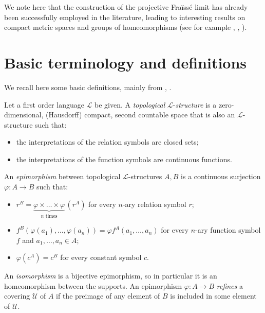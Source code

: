 \documentclass[12pt,twoside,a4paper]{amsart}
\theoremstyle{plain}
\theoremstyle{definition}
\begin{document}
We note here that the construction of the projective Fra\"iss\'e limit has already been successfully employed in the literature, leading to interesting results on compact metric spaces and groups of homeomorphisms (see for example \cite{Kwiatk2012}, \cite{Kwiatk2014}, \cite{Bartos2015}).

\section{Basic terminology and definitions} \label{defandnot}
We recall here some basic definitions, mainly from \cite{Irwin2006}, \cite{Camerl2010}.

Let a first order language $ \mathcal L $ be given.
A {\it topological} $ \mathcal L $-{\it structure} is a zero-dimensional, (Hausdorff) compact, second countable space that is also an $ \mathcal L $-structure such that:
\begin{itemize}
\item the interpretations of the relation symbols are closed sets;
\item the interpretations of the function symbols are continuous functions.
\end{itemize}
An {\it epimorphism} between topological $ \mathcal L $-structures $A,B$ is a continuous surjection $ {\varphi} :A\to B$ such that:
\begin{itemize}
\item $r^B=\underset{n \text{ times}}{\underbrace{ {\varphi} \times \ldots \times {\varphi}}}\,(r^A)$ for every $n$-ary relation symbol $r$;
\item $f^B( {\varphi} (a_1),\ldots , {\varphi} (a_n))= {\varphi} f^A(a_1,\ldots ,a_n)$ for every $n$-ary function symbol $f$ and $a_1,\ldots ,a_n\in A$;
\item $ {\varphi} (c^A)=c^B$ for every constant symbol $c$.
\end{itemize}
An {\it isomorphism} is a bijective epimorphism, so in particular it is an homeomorphism between the supports.
An epimorphism $ {\varphi} :A\to B$ {\it refines} a covering $ \mathcal U $ of $A$ if the preimage of any element of $B$ is included in some element of $ \mathcal U $.
\end{document}

